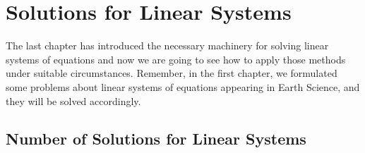 \chapter{Solutions for Linear Systems}
\label{chap:SolLinSys}

The last chapter has introduced the necessary machinery for solving linear systems of equations and now we are going to see how to apply those methods under suitable circumstances. Remember, in the first chapter, we formulated some problems about linear systems of equations appearing in Earth Science, and they will be solved accordingly.

\section{Number of Solutions for Linear Systems}
\label{section:NoSolLinSys}

